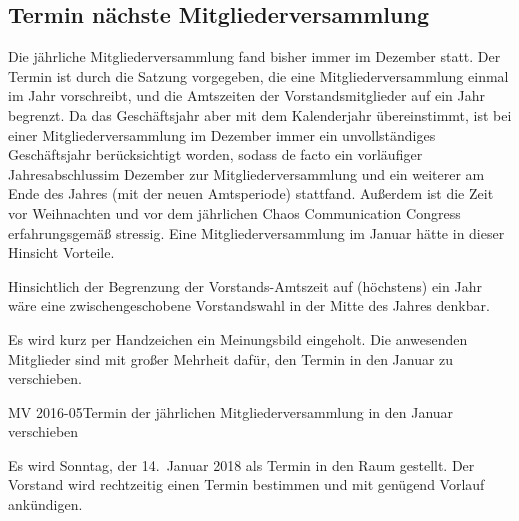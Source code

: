 \documentclass[parskip=half-]{s0minutes}
\begin{document}
\subsection{Termin nächste Mitgliederversammlung}
Die jährliche Mitgliederversammlung fand bisher immer im Dezember statt. Der
Termin ist durch die Satzung vorgegeben, die eine Mitgliederversammlung einmal
im Jahr vorschreibt, und die Amtszeiten der Vorstandsmitglieder auf ein Jahr
begrenzt. Da das Geschäftsjahr aber mit dem Kalenderjahr übereinstimmt, ist bei
einer Mitgliederversammlung im Dezember immer ein unvollständiges Geschäftsjahr
berücksichtigt worden, sodass de facto ein vorläufiger Jahresabschlussim
Dezember zur Mitgliederversammlung und ein weiterer am Ende des Jahres (mit der
neuen Amtsperiode) stattfand. Außerdem ist die Zeit vor Weihnachten und vor dem
jährlichen Chaos Communication Congress erfahrungsgemäß stressig. Eine
Mitgliederversammlung im Januar hätte in dieser Hinsicht Vorteile.

Hinsichtlich der Begrenzung der Vorstands-Amtszeit auf (höchstens) ein Jahr wäre
eine zwischengeschobene Vorstandswahl in der Mitte des Jahres denkbar.

Es wird kurz per Handzeichen ein Meinungsbild eingeholt. Die anwesenden
Mitglieder sind mit großer Mehrheit dafür, den Termin in den Januar zu
verschieben.

\begin{resolution}{MV 2016-05}{\consensus{\adopted}}{Termin der jährlichen
	Mitgliederversammlung in den Januar verschieben}{}
\end{resolution}

Es wird Sonntag, der 14.\, Januar 2018 als Termin in den Raum gestellt. Der
Vorstand wird rechtzeitig einen Termin bestimmen und mit genügend Vorlauf
ankündigen.

\end{document}

